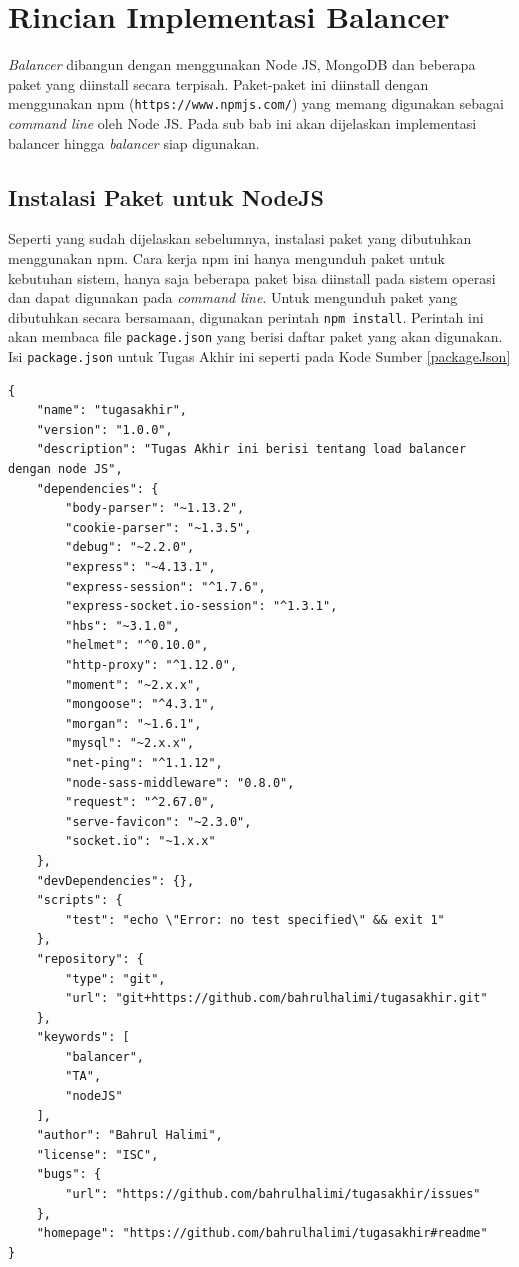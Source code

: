 \documentclass{ta-its}
\begin{document}
		\section{Rincian Implementasi Balancer}
		
			\textit{Balancer} dibangun dengan menggunakan Node JS, MongoDB dan beberapa paket yang diinstall secara terpisah. Paket-paket ini diinstall dengan menggunakan npm (\texttt{https://www.npmjs.com/}) yang memang digunakan sebagai \textit{command line} oleh Node JS. Pada sub bab ini akan dijelaskan implementasi balancer hingga \textit{balancer} siap digunakan.
			
			\subsection{Instalasi Paket untuk NodeJS}
			Seperti yang sudah dijelaskan sebelumnya, instalasi paket yang dibutuhkan menggunakan npm. Cara kerja npm ini hanya mengunduh paket untuk kebutuhan sistem, hanya saja beberapa paket bisa diinstall pada sistem operasi dan dapat digunakan pada \textit{command line}. 
			Untuk mengunduh paket yang dibutuhkan secara bersamaan, digunakan perintah \texttt{npm install}. Perintah ini akan membaca file \texttt{package.json} yang berisi daftar paket yang akan digunakan. Isi \texttt{package.json} untuk Tugas Akhir ini seperti pada Kode Sumber \ref{packageJson}

			\begin{lstlisting}[frame=single,tabsize=2,breaklines,caption={Isi Package.Json},label=packageJson]
{
	"name": "tugasakhir",
	"version": "1.0.0",
	"description": "Tugas Akhir ini berisi tentang load balancer dengan node JS",
	"dependencies": {
		"body-parser": "~1.13.2",
		"cookie-parser": "~1.3.5",
		"debug": "~2.2.0",
		"express": "~4.13.1",
		"express-session": "^1.7.6",
		"express-socket.io-session": "^1.3.1",
		"hbs": "~3.1.0",
		"helmet": "^0.10.0",
		"http-proxy": "^1.12.0",
		"moment": "~2.x.x",
		"mongoose": "^4.3.1",
		"morgan": "~1.6.1",
		"mysql": "~2.x.x",
		"net-ping": "^1.1.12",
		"node-sass-middleware": "0.8.0",
		"request": "^2.67.0",
		"serve-favicon": "~2.3.0",
		"socket.io": "~1.x.x"
	},
	"devDependencies": {},
	"scripts": {
		"test": "echo \"Error: no test specified\" && exit 1"
	},
	"repository": {
		"type": "git",
		"url": "git+https://github.com/bahrulhalimi/tugasakhir.git"
	},
	"keywords": [
		"balancer",
		"TA",
		"nodeJS"
	],
	"author": "Bahrul Halimi",
	"license": "ISC",
	"bugs": {
		"url": "https://github.com/bahrulhalimi/tugasakhir/issues"
	},
	"homepage": "https://github.com/bahrulhalimi/tugasakhir#readme"
}

				
			\end{lstlisting}
			
\end{document}
